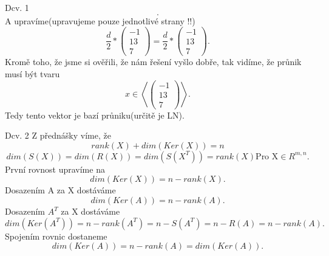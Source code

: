 \documentclass[a4paper]{article}
\begin{document}
\begin{section}{Dcv. 1}
\[            .\] 
            A upravíme(upravujeme pouze jednotlivé strany !!) \[
                \frac{d}{2}*\begin{pmatrix} -1 \\ 13 \\ 7\end{pmatrix} = \frac{d}{2}*\begin{pmatrix} -1 \\ 13 \\ 7 \end{pmatrix}
            .\] 
            Kromě toho, že jsme si ověřili, že nám řešení vyšlo dobře, tak vidíme, že průnik musí být tvaru \[
            x \in \left<\begin{pmatrix} -1 \\ 13 \\ 7 \end{pmatrix}\right> 
            .\] 
            Tedy tento vektor je bazí průniku(určitě je LN).
\end{section}
\begin{section}{Dcv. 2}
    Z přednášky víme, že \[
        rank(X) + dim(Ker(X)) = n
    \] \[
    dim(S(X)) = dim(R(X)) = dim(S(X^T)) = rank(X) \text{Pro X} \in R^{m,n}
    .\]      První rovnost upravíme na
    \[
        dim(Ker(X)) = n - rank(X)
    .\] 
        Dosazením A za X dostáváme
        \[
            dim(Ker(A)) = n - rank(A)
        .\] 
        Dosazením $A^T$ za X dostáváme
        \[
            dim(Ker(A^T)) = n - rank(A^T) = n - S(A^T) = n - R(A) = n - rank(A)
        .\] 
        Spojením rovnic dostaneme
        \[
            dim(Ker(A)) = n - rank(A) = dim(Ker(A))
        .\] 
\end{section}
\end{document}
